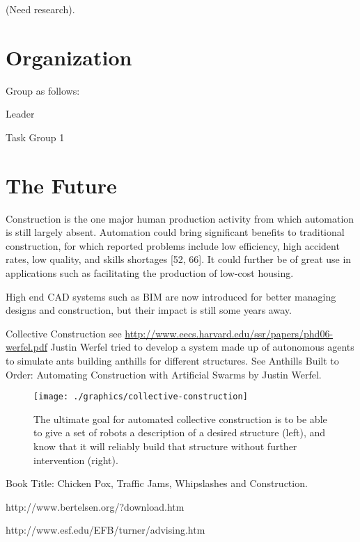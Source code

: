 (Need research).


\chapter{Organization}

Group as follows:

Leader

Task Group 1


\chapter{The Future}

Construction is the one major human production activity from which automation is still largely absent. Automation could bring signiﬁcant beneﬁts to traditional construction, for which reported problems include low eﬃciency, high
accident rates, low quality, and skills shortages [52, 66]. It could further be of
great use in applications such as facilitating the production of low-cost housing.

High end CAD systems such as BIM are now introduced for better managing designs and construction, but their impact is still some years away.


Collective Construction see \url{http://www.eecs.harvard.edu/ssr/papers/phd06-werfel.pdf} Justin Werfel tried to develop a system made up of autonomous agents to simulate ants building anthills for different structures. See Anthills Built to Order: Automating Construction with Artiﬁcial Swarms by Justin Werfel.


\begin{figure}
\texttt{[image: ./graphics/collective-construction]}
\caption{The ultimate goal for automated collective construction is to be able to
give a set of robots a description of a desired structure (left), and know that it will
reliably build that structure without further intervention (right).}
\end{figure}




Book Title: Chicken Pox, Traffic Jams, Whipslashes and Construction.


http://www.bertelsen.org/?download.htm

http://www.esf.edu/EFB/turner/advising.htm






















































